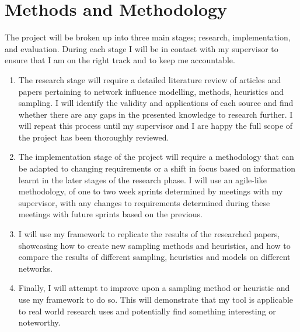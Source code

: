 \documentclass{article}
\begin{document}
\section{Methods and Methodology} \label{methods}

The project will be broken up into three main stages; research, implementation, and evaluation.
During each stage I will be in contact with my supervisor to ensure that I am on the right track and to keep me accountable.

\begin{enumerate}

	\item The research stage will require a detailed literature review of articles and papers pertaining to network influence modelling, methods, heuristics and sampling.
	      I will identify the validity and applications of each source and find whether there are any gaps in the presented knowledge to research further.
	      I will repeat this process until my supervisor and I are happy the full scope of the project has been thoroughly reviewed.

	\item The implementation stage of the project will require a methodology that can be adapted to changing requirements or a shift in focus based on information learnt in the later stages of the research phase.
	      I will use an agile-like methodology, of one to two week sprints determined by meetings with my supervisor, with any changes to requirements determined during these meetings with future sprints based on the previous.

	\item I will use my framework to replicate the results of the researched papers, showcasing how to create new sampling methods and heuristics, and how to compare the results of different sampling, heuristics and models on different networks.

	\item Finally, I will attempt to improve upon a sampling method or heuristic and use my framework to do so. This will demonstrate that my tool is applicable to real world research uses and potentially find something interesting or noteworthy.

\end{enumerate}
\end{document}
